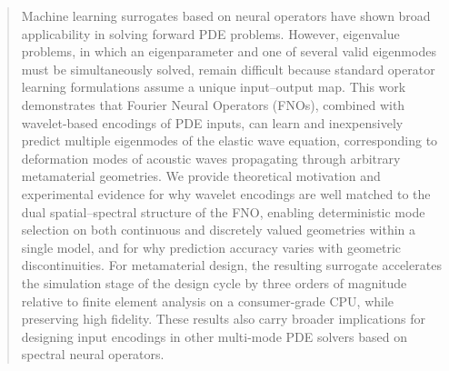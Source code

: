 \documentclass[preprint,review,12pt,numafflabel]{elsarticle}
\begin{document}
\begin{frontmatter}
\author[Mech]{Han Zhang}
\author[Caltech]{Alexander Ogren}
\author[Comp]{Cynthia Rudin}
\author[Mech]{\protect\\Johann Guilleminot}
\author[Mech]{L. Catherine Brinson}
\begin{abstract}
Machine learning surrogates based on neural operators have shown broad applicability in solving forward PDE problems. However, eigenvalue problems, in which an eigenparameter and one of several valid eigenmodes must be simultaneously solved, remain difficult because standard operator learning formulations assume a unique input--output map. This work demonstrates that Fourier Neural Operators (FNOs), combined with wavelet-based encodings of PDE inputs, can learn and inexpensively predict multiple eigenmodes of the elastic wave equation, corresponding to deformation modes of acoustic waves propagating through arbitrary metamaterial geometries. We provide theoretical motivation and experimental evidence for why wavelet encodings are well matched to the dual spatial--spectral structure of the FNO, enabling deterministic mode selection on both continuous and discretely valued geometries within a single model, and for why prediction accuracy varies with geometric discontinuities. For metamaterial design, the resulting surrogate accelerates the simulation stage of the design cycle by three orders of magnitude relative to finite element analysis on a consumer-grade CPU, while preserving high fidelity. These results also carry broader implications for designing input encodings in other multi-mode PDE solvers based on spectral neural operators.


\end{abstract}
\end{frontmatter}
\end{document}
